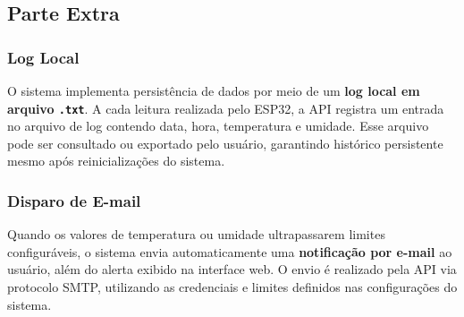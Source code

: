 \subsection{Parte Extra}

\subsubsection{Log Local}

O sistema implementa persistência de dados por meio de um \textbf{log local em
arquivo \texttt{.txt}}. A cada leitura realizada pelo ESP32, a API registra um
entrada no arquivo de log contendo data, hora, temperatura e umidade. Esse
arquivo pode ser consultado ou exportado pelo usuário, garantindo histórico
persistente mesmo após reinicializações do sistema.

\subsubsection{Disparo de E-mail}

Quando os valores de temperatura ou umidade ultrapassarem limites configuráveis,
o sistema envia automaticamente uma \textbf{notificação por e-mail} ao usuário,
além do alerta exibido na interface web. O envio é realizado pela API via
protocolo SMTP, utilizando as credenciais e limites definidos nas configurações
do sistema.
